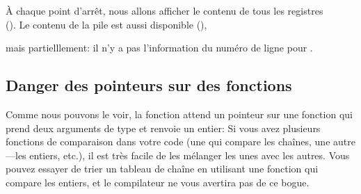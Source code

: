À chaque point d'arrêt, nous allons afficher le contenu de tous les registres\\
().
Le contenu de la pile est aussi disponible (),

mais partielllement: il n'y a pas l'information du numéro de ligne pour \comp.



\subsection{Danger des pointeurs sur des fonctions}

Comme nous pouvons le voir, la fonction \qsort attend un pointeur sur une fonction
qui prend deux arguments de type  et renvoie un entier:
Si vous avez plusieurs fonctions de comparaison dans votre code (une qui compare
les chaînes, une autre---les entiers, etc.), il est très facile de les mélanger les
unes avec les autres.
Vous pouvez essayer de trier un tableau de chaîne en utilisant une fonction qui compare
les entiers, et le compilateur ne vous avertira pas de ce bogue.

